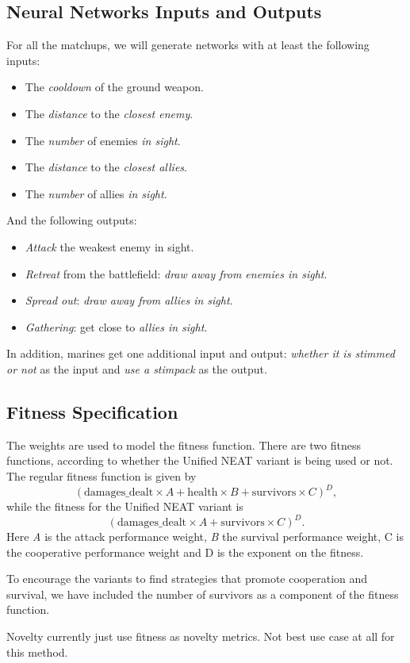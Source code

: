 \subsection{Neural Networks Inputs and Outputs}

For all the matchups, we will generate networks with at least the following inputs:
\begin{itemize}
    \item The \emph{cooldown} of the ground weapon.
    \item The \emph{distance} to the \emph{closest enemy}.
    \item The \emph{number} of enemies \emph{in sight}.
    \item The \emph{distance} to the \emph{closest allies}.
    \item The \emph{number} of allies \emph{in sight}.
\end{itemize}

And the following outputs:
\begin{itemize}
    \item \emph{Attack} the weakest enemy in sight.
    \item \emph{Retreat} from the battlefield: \emph{draw away from enemies in sight}.
    \item \emph{Spread out}: \emph{draw away from allies in sight}.
    \item \emph{Gathering}: get close to \emph{allies in sight}.
\end{itemize}

In addition, marines get one additional input and output:
\emph{whether it is stimmed or not} as the input and \emph{use a stimpack} as the output.

\subsection{Fitness Specification}

The weights are used to model the fitness function. There are two
fitness functions, according to whether the Unified NEAT variant is
being used or not.  The regular fitness function is given by
\begin{equation*}
  (\text{damages\_dealt} \times A + \text{health} \times B + \text{survivors} \times C)^D,
\end{equation*}
while the fitness for the Unified NEAT variant is
\begin{equation*}
  (\text{damages\_dealt} \times A + \text{survivors} \times C)^D.
\end{equation*}
Here \emph{A} is the attack performance weight, \emph{B} the survival
performance weight, C is the cooperative performance weight and D is
the exponent on the fitness.

To encourage the variants to find strategies that promote cooperation
and survival, we have included the number of survivors as a component
of the fitness function.

Novelty currently just use fitness as novelty metrics. Not best use case at
all for this method.

